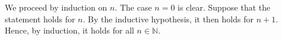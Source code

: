 We proceed by induction on $n$.
The case $n = 0$ is clear.
Suppose that the statement holds for $n$.
By the inductive hypothesis, it then holds for $n + 1$.
Hence, by induction, it holds for all $n \in \mathbb{N}$.